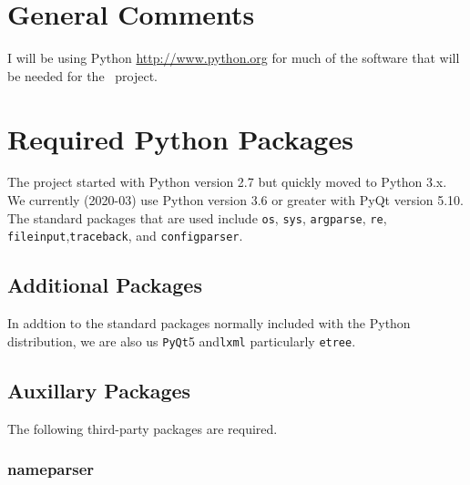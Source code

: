 
\section{General Comments}

I will be using Python \url{http://www.python.org} for much of the software
that will be needed for the \ProjectTitle\ project.

\section{Required Python Packages}

The project started with Python version 2.7 but quickly moved to
Python 3.x. We currently (2020-03) use Python version 3.6 or greater
with PyQt version 5.10.  The standard packages that are used include
\texttt{os}, \texttt{sys}, \texttt{argparse}, \texttt{re},
\texttt{fileinput},\texttt{traceback}, and \texttt{configparser}.

\subsection{Additional Packages}

In addtion to the standard packages normally included with the Python
distribution, we are also us \texttt{PyQt}5 and\texttt{lxml}
particularly \texttt{etree}. 

\subsection{Auxillary Packages}
The following third-party packages are required.

\subsubsection{nameparser}

